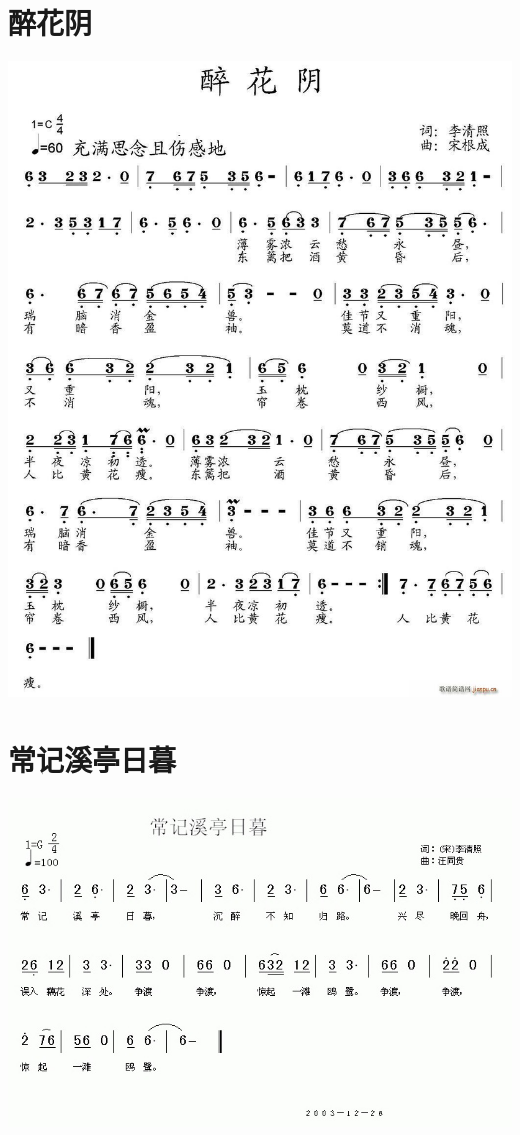 \documentclass[cn,pad,twocol]{elegantbook}
\begin{document}
\section{醉花阴}
    \includegraphics[width=\textwidth]{dongxiao/20200808-醉花阴-李清照.jpg} 
\section{常记溪亭日暮}
    \includegraphics[width=\textwidth]{dongxiao/20200808-常记溪亭日暮-李清照.jpg}
\end{document}
